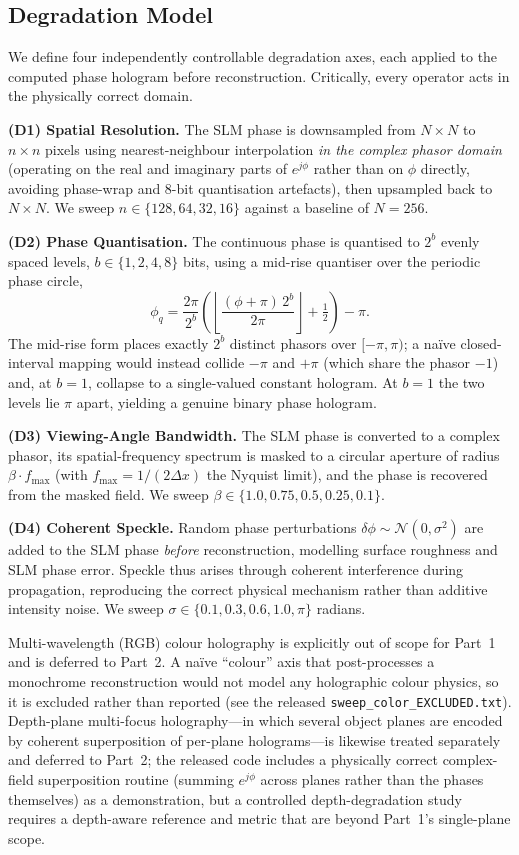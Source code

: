 \documentclass[conference]{IEEEtran}
\begin{document}
\subsection{Degradation Model}
We define four independently controllable degradation axes, each applied to the
computed phase hologram before reconstruction. Critically, every operator acts
in the physically correct domain.

\textbf{(D1) Spatial Resolution.} The SLM phase is downsampled from $N\times N$
to $n\times n$ pixels using nearest-neighbour interpolation \emph{in the complex
phasor domain} (operating on the real and imaginary parts of $e^{j\phi}$ rather
than on $\phi$ directly, avoiding phase-wrap and $8$-bit quantisation artefacts),
then upsampled back to $N\times N$. We sweep $n \in \{128, 64, 32, 16\}$ against a
baseline of $N=256$.

\textbf{(D2) Phase Quantisation.} The continuous phase is quantised to $2^b$
evenly spaced levels, $b \in \{1, 2, 4, 8\}$ bits, using a mid-rise quantiser
over the periodic phase circle,
\begin{equation}
  \phi_q = \frac{2\pi}{2^b}\!\left(\left\lfloor \frac{(\phi+\pi)\, 2^b}{2\pi} \right\rfloor + \tfrac{1}{2}\right) - \pi.
\end{equation}
The mid-rise form places exactly $2^b$ distinct phasors over $[-\pi,\pi)$; a
na\"ive closed-interval mapping would instead collide $-\pi$ and $+\pi$ (which
share the phasor $-1$) and, at $b=1$, collapse to a single-valued constant
hologram. At $b=1$ the two levels lie $\pi$ apart, yielding a genuine binary
phase hologram.

\textbf{(D3) Viewing-Angle Bandwidth.} The SLM phase is converted to a complex
phasor, its spatial-frequency spectrum is masked to a circular aperture of radius
$\beta \cdot f_{\max}$ (with $f_{\max} = 1/(2\Delta x)$ the Nyquist limit), and
the phase is recovered from the masked field. We sweep
$\beta \in \{1.0, 0.75, 0.5, 0.25, 0.1\}$.

\textbf{(D4) Coherent Speckle.} Random phase perturbations $\delta\phi \sim
\mathcal{N}(0, \sigma^2)$ are added to the SLM phase \emph{before}
reconstruction, modelling surface roughness and SLM phase error. Speckle thus
arises through coherent interference during propagation, reproducing the correct
physical mechanism rather than additive intensity noise. We sweep
$\sigma \in \{0.1, 0.3, 0.6, 1.0, \pi\}$ radians.

Multi-wavelength (RGB) colour holography is explicitly out of scope for Part~1
and is deferred to Part~2. A na\"ive ``colour'' axis that post-processes a
monochrome reconstruction would not model any holographic colour physics, so it
is excluded rather than reported (see the released
\texttt{sweep\_color\_EXCLUDED.txt}). Depth-plane multi-focus holography---in
which several object planes are encoded by coherent superposition of
per-plane holograms---is likewise treated separately and deferred to Part~2; the
released code includes a physically correct complex-field superposition routine
(summing $e^{j\phi}$ across planes rather than the phases themselves) as a
demonstration, but a controlled depth-degradation study requires a depth-aware
reference and metric that are beyond Part~1's single-plane scope.
\end{document}
